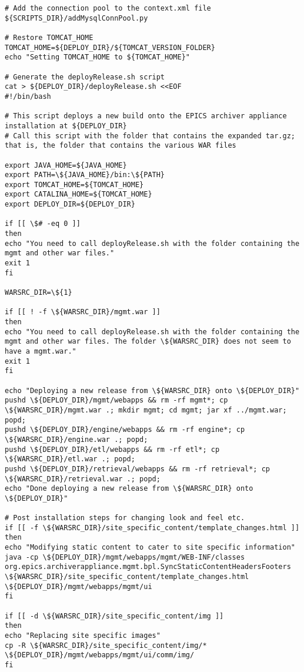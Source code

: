 \documentclass[11pt
  , a4paper
  , article
  , oneside
]{memoir}
\begin{document}
\begin{lstlisting}[style=termstyle]
# Add the connection pool to the context.xml file
${SCRIPTS_DIR}/addMysqlConnPool.py

# Restore TOMCAT_HOME
TOMCAT_HOME=${DEPLOY_DIR}/${TOMCAT_VERSION_FOLDER}
echo "Setting TOMCAT_HOME to ${TOMCAT_HOME}"

# Generate the deployRelease.sh script
cat > ${DEPLOY_DIR}/deployRelease.sh <<EOF
#!/bin/bash

# This script deploys a new build onto the EPICS archiver appliance installation at ${DEPLOY_DIR}
# Call this script with the folder that contains the expanded tar.gz; that is, the folder that contains the various WAR files

export JAVA_HOME=${JAVA_HOME}
export PATH=\${JAVA_HOME}/bin:\${PATH}
export TOMCAT_HOME=${TOMCAT_HOME}
export CATALINA_HOME=${TOMCAT_HOME}
export DEPLOY_DIR=${DEPLOY_DIR}

if [[ \$# -eq 0 ]]
then
echo "You need to call deployRelease.sh with the folder containing the mgmt and other war files."
exit 1
fi

WARSRC_DIR=\${1}

if [[ ! -f \${WARSRC_DIR}/mgmt.war ]]
then
echo "You need to call deployRelease.sh with the folder containing the mgmt and other war files. The folder \${WARSRC_DIR} does not seem to have a mgmt.war."
exit 1
fi

echo "Deploying a new release from \${WARSRC_DIR} onto \${DEPLOY_DIR}"
pushd \${DEPLOY_DIR}/mgmt/webapps && rm -rf mgmt*; cp \${WARSRC_DIR}/mgmt.war .; mkdir mgmt; cd mgmt; jar xf ../mgmt.war; popd; 
pushd \${DEPLOY_DIR}/engine/webapps && rm -rf engine*; cp \${WARSRC_DIR}/engine.war .; popd; 
pushd \${DEPLOY_DIR}/etl/webapps && rm -rf etl*; cp \${WARSRC_DIR}/etl.war .; popd; 
pushd \${DEPLOY_DIR}/retrieval/webapps && rm -rf retrieval*; cp \${WARSRC_DIR}/retrieval.war .; popd;
echo "Done deploying a new release from \${WARSRC_DIR} onto \${DEPLOY_DIR}"

# Post installation steps for changing look and feel etc.
if [[ -f \${WARSRC_DIR}/site_specific_content/template_changes.html ]]
then
echo "Modifying static content to cater to site specific information"
java -cp \${DEPLOY_DIR}/mgmt/webapps/mgmt/WEB-INF/classes org.epics.archiverappliance.mgmt.bpl.SyncStaticContentHeadersFooters \${WARSRC_DIR}/site_specific_content/template_changes.html \${DEPLOY_DIR}/mgmt/webapps/mgmt/ui
fi

if [[ -d \${WARSRC_DIR}/site_specific_content/img ]]
then
echo "Replacing site specific images"
cp -R \${WARSRC_DIR}/site_specific_content/img/* \${DEPLOY_DIR}/mgmt/webapps/mgmt/ui/comm/img/
fi



\end{lstlisting}
\end{document}
